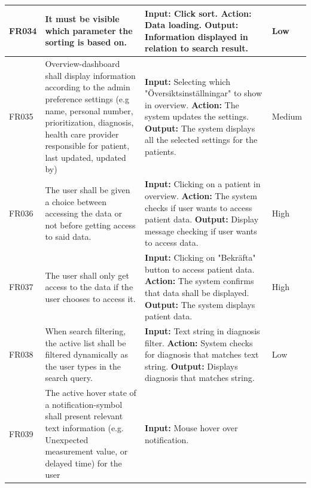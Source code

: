 \documentclass{scrreprt}
\begin{document}
\begin{center}
\begin{tabularx}{\linewidth}{| l | X | X | l |}
\hline
\end{tabularx}
\begin{tabularx}{\linewidth}{| l | X | X | l |}
\hline
FR034 & It must be visible which parameter the sorting is based on. & \textbf{Input:} Click sort.
\newline \textbf{Action:} Data loading.
\newline \textbf{Output:} Information displayed in relation to search result. & Low \\ 
\hline
FR035 & Overview-dashboard shall display information according to the admin preference settings (e.g name, personal number, prioritization, diagnosis, health care provider responsible for patient, last updated, updated by) & \textbf{Input:} Selecting which "Översiktsinställningar" to show in overview.
\newline \textbf{Action:} The system updates the settings.
\newline \textbf{Output:} The system displays all the selected settings for the patients. & Medium \\ 
\hline
FR036 & The user shall be given a choice between accessing the data or not before getting access to said data. & \textbf{Input:} Clicking on a patient in overview.
\newline \textbf{Action:} The system checks if user wants to access patient data.
\newline \textbf{Output:} Display message checking if user wants to access data. & High \\ 
\hline
FR037 & The user shall only get access to the data if the user chooses to access it. & \textbf{Input:} Clicking on "Bekräfta" button to access patient data.
\newline \textbf{Action:} The system confirms that data shall be displayed.
\newline \textbf{Output:} The system displays patient data. & High \\ 
\hline
FR038 & When search filtering, the active list shall be filtered dynamically as the user types in the search query. & \textbf{Input:} Text string in diagnosis filter.
\newline \textbf{Action:} System checks for diagnosis that matches text string.
\newline \textbf{Output:} Displays diagnosis that matches string. & Low \\
\hline
FR039 & The active hover state of a notification-symbol shall present relevant text information (e.g. Unexpected measurement value, or delayed time) for the user   & \textbf{Input:} Mouse hover over notification.

\end{tabularx}
\end{center}
\end{document}
